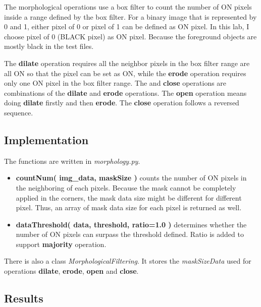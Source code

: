 \documentclass[paper=a4, fontsize=11pt]{scrartcl}
\numberwithin{equation}{section}		%
\numberwithin{figure}{section}			%
\numberwithin{table}{section}				%
\begin{document}
The morphological operations use a box filter to count the number of ON pixels inside a range defined by the box filter.
For a binary image that is represented by 0 and 1, either pixel of 0 or pixel of 1 can be defined as ON pixel. 
In this lab, I choose pixel of 0 (BLACK pixel) as ON pixel.
Because the foreground objects are mostly black in the test files.

The \textbf{dilate} operation requires all the neighbor pixels in the box filter range are all ON so that the pixel can be set as ON, 
while the \textbf{erode} operation requires only one ON pixel in the box filter range.
The  and \textbf{close} operations are combinations of the \textbf{dilate} and \textbf{erode} operations.
The \textbf{open} operation means doing \textbf{dilate} firstly and then \textbf{erode}.
The \textbf{close} operation follows a reversed sequence.

\subsection{Implementation}

The functions are written in \emph{morphology.py}.

\begin{itemize}
\item \textbf{ countNum( img\_data, maskSize ) } counts the number of ON pixels in the neighboring of each pixels. 
Because the mask cannot be completely applied in the corners, the mask data size might be different for different pixel.
Thus, an array of mask data size for each pixel is returned as well.
\item \textbf{ dataThreshold( data, threshold, ratio=1.0 ) } determines whether the number of ON pixels can surpass the threshold defined.
Ratio is added to support \textbf{majority} operation.
\end{itemize}

There is also a class \emph{MorphologicalFiltering}.
It stores the \emph{maskSizeData} used for operations \textbf{dilate}, \textbf{erode}, \textbf{open} and \textbf{close}.

\subsection{Results}

\end{document}
